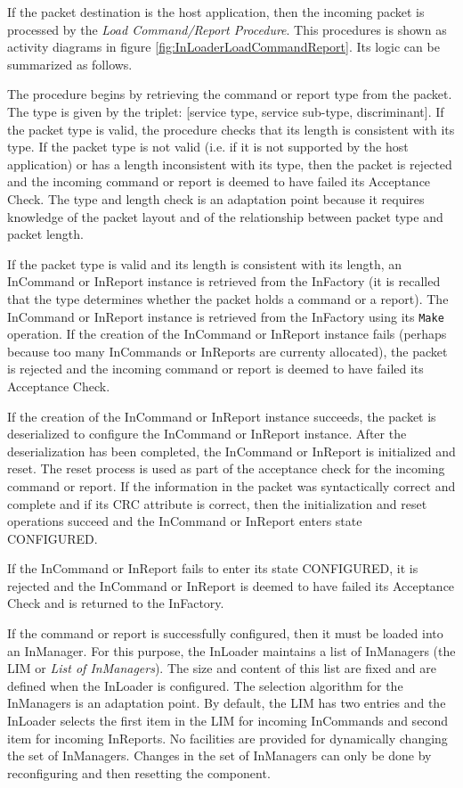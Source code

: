 If the packet destination is the host application, then the incoming packet is processed by the \textit{Load Command/Report Procedure}. This procedures is shown as activity diagrams in figure \ref{fig:InLoaderLoadCommandReport}. Its logic can be summarized as follows.

The procedure begins by retrieving the command or report type from the packet. The type is given by the triplet: [service type, service sub-type, discriminant]. If the packet type is valid, the procedure checks that its length is consistent with its type. If the packet type is not valid (i.e. if it is not supported by the host application) or has a length inconsistent with its type, then the packet is rejected and the incoming command or report is deemed to have failed its Acceptance Check. The type and length check is an adaptation point because it requires knowledge of the packet layout and of the relationship between packet type and packet length.

If the packet type is valid and its length is consistent with its length, an InCommand or InReport instance is retrieved from the InFactory (it is recalled that the type determines whether the packet holds a command or a report). The InCommand or InReport instance is retrieved from the InFactory using its \texttt{Make} operation. If the creation of the InCommand or InReport instance fails (perhaps because too many InCommands or InReports are currenty allocated), the packet is rejected and the incoming command or report is deemed to have failed its Acceptance Check.

If the creation of the InCommand or InReport instance succeeds, the packet is deserialized to configure the InCommand or InReport instance. After the deserialization has been completed, the InCommand or InReport is initialized and reset. The reset process is used as part of the acceptance check for the incoming command or report. If the information in the packet was syntactically correct and complete and if its CRC attribute is correct, then the initialization and reset operations succeed and the InCommand or InReport enters state CONFIGURED.

If the InCommand or InReport fails to enter its state CONFIGURED, it is rejected and the InCommand or InReport is deemed to have failed its Acceptance Check and is returned to the InFactory.

If the command or report is successfully configured, then it must be loaded into an InManager. For this purpose, the InLoader maintains a list of InManagers (the LIM or \textit{List of InManagers}). The size and content of this list are fixed and are defined when the InLoader is configured. The selection algorithm for the InManagers is an adaptation point. By default, the LIM has two entries and the InLoader selects the first item in the LIM for incoming InCommands and second item for incoming InReports. 
No facilities are provided for dynamically changing the set of InManagers. Changes in the set of InManagers can only be done by reconfiguring and then resetting the component.

